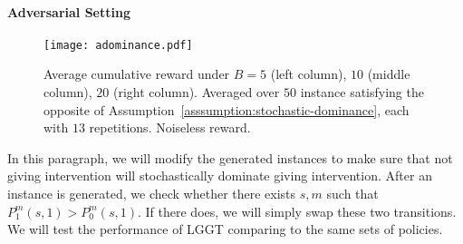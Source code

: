


\paragraph{Adversarial Setting}\label{paragraph:experiments-opposite-stochastic-dominance}
  \begin{figure*}[ht]
       \centering
\texttt{[image: adominance.pdf]}
        \caption{Average cumulative reward under $B=5$ (left column), $10$ (middle column), $20$ (right column). Averaged over $50$ instance satisfying the opposite of Assumption~\ref{asssumption:stochastic-dominance}, each with $13$ repetitions. Noiseless reward. }
        \label{fig:sub6}
         \vskip -0.1in
    \end{figure*}
In this paragraph, we will modify the generated instances to make sure that not giving intervention will stochastically dominate giving intervention. After an instance is generated, we check whether there exists $s,m$ such that $P_1^m(s,1)>P_0^m(s,1)$. If there does, we will simply swap these two transitions. We will test the performance of LGGT comparing to the same sets of policies.

